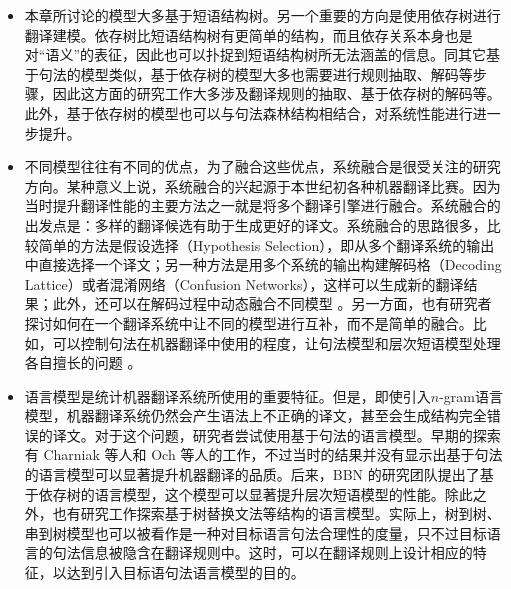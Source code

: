 \begin{itemize}
\vspace{0.5em}
\item 本章所讨论的模型大多基于短语结构树。另一个重要的方向是使用依存树进行翻译建模。依存树比短语结构树有更简单的结构，而且依存关系本身也是对“语义”的表征，因此也可以扑捉到短语结构树所无法涵盖的信息。同其它基于句法的模型类似，基于依存树的模型大多也需要进行规则抽取、解码等步骤，因此这方面的研究工作大多涉及翻译规则的抽取、基于依存树的解码等。此外，基于依存树的模型也可以与句法森林结构相结合，对系统性能进行进一步提升。
\vspace{0.5em}
\item 不同模型往往有不同的优点，为了融合这些优点，系统融合是很受关注的研究方向。某种意义上说，系统融合的兴起源于本世纪初各种机器翻译比赛。因为当时提升翻译性能的主要方法之一就是将多个翻译引擎进行融合。系统融合的出发点是：多样的翻译候选有助于生成更好的译文。系统融合的思路很多，比较简单的方法是假设选择（Hypothesis Selection），即从多个翻译系统的输出中直接选择一个译文；另一种方法是用多个系统的输出构建解码格（Decoding Lattice）或者混淆网络（Confusion Networks），这样可以生成新的翻译结果；此外，还可以在解码过程中动态融合不同模型 。另一方面，也有研究者探讨如何在一个翻译系统中让不同的模型进行互补，而不是简单的融合。比如，可以控制句法在机器翻译中使用的程度，让句法模型和层次短语模型处理各自擅长的问题 。
\vspace{0.5em}
\item 语言模型是统计机器翻译系统所使用的重要特征。但是，即使引入$n$-gram语言模型，机器翻译系统仍然会产生语法上不正确的译文，甚至会生成结构完全错误的译文。对于这个问题，研究者尝试使用基于句法的语言模型。早期的探索有 Charniak 等人和 Och 等人的工作，不过当时的结果并没有显示出基于句法的语言模型可以显著提升机器翻译的品质。后来，BBN 的研究团队提出了基于依存树的语言模型，这个模型可以显著提升层次短语模型的性能。除此之外，也有研究工作探索基于树替换文法等结构的语言模型。实际上，树到树、串到树模型也可以被看作是一种对目标语言句法合理性的度量，只不过目标语言的句法信息被隐含在翻译规则中。这时，可以在翻译规则上设计相应的特征，以达到引入目标语句法语言模型的目的。
\vspace{0.5em}
\end{itemize}



